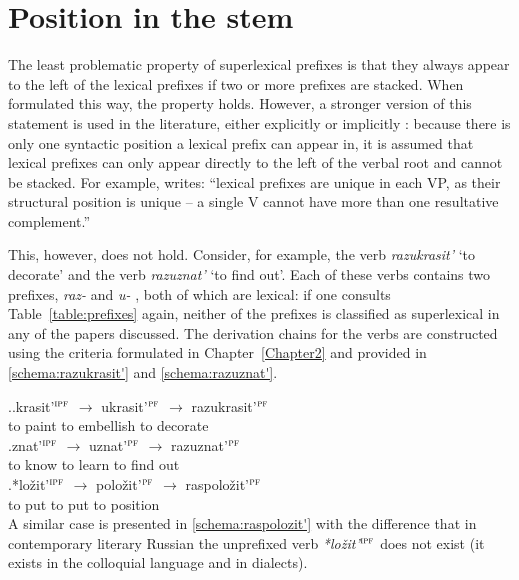 \section{Position in the stem}\label{section:new:position}
The least problematic property of superlexical prefixes  is that they always appear to the left of the lexical prefixes  if two or more prefixes are stacked. When formulated this way, the property holds. However, a stronger version of this statement is used in the literature, either explicitly \citep{Svenonius:04b} or implicitly \citep{Tatevosov:09}: because there is only one syntactic position a lexical prefix  can appear in, it is assumed that lexical prefixes  can only appear directly to the left of the verbal root and cannot be stacked. For example, \citet[206]{Svenonius:04b} writes: ``lexical prefixes  are unique in each VP, as their structural position is unique -- a single V cannot have more than one resultative  complement.''


This, however, does not hold. Consider, for example, the verb \textit{razukrasit'} `to decorate' and the verb \textit{razuznat'} `to find out'. Each of these verbs contains two prefixes, \textit{raz-}   and \textit{u-} , both of which are lexical: if one consults Table~\ref{table:prefixes} again, neither of the prefixes is classified as superlexical in any of the papers discussed. The derivation chains for the verbs are constructed using the criteria formulated in Chapter~\ref{Chapter2} and provided in \ref{schema:razukrasit'} and \ref{schema:razuznat'}.

\ex.\ag.\label{schema:razukrasit'}krasit'$^{\textsc{ipf}}$ {$\rightarrow$} ukrasit'$^{\textsc{pf}}$ {$\rightarrow$} razukrasit'$^{\textsc{pf}}$\\
{to paint} {} {to embellish} {} {to decorate}\\
\bg.\label{schema:razuznat'}znat'$^{\textsc{ipf}}$ {$\rightarrow$} uznat'$^{\textsc{pf}}$ {$\rightarrow$} razuznat'$^{\textsc{pf}}$\\
{to know} {} {to learn} {} {to find out}\\
\bg.*lo\v{z}it'$^{\textsc{ipf}}$ {$\rightarrow$} polo\v{z}it'$^{\textsc{pf}}$ {$\rightarrow$} raspolo\v{z}it'$^{\textsc{pf}}$\label{schema:raspolozit'}\\
{to put} {} {to put} {} {to position}\\

A similar case is presented in \ref{schema:raspolozit'}
with the difference that in contemporary literary Russian the unprefixed verb \textit{*lo\v{z}it'}$^{\textsc{ipf}}$ does not exist (it exists in the colloquial language and in dialects). 

